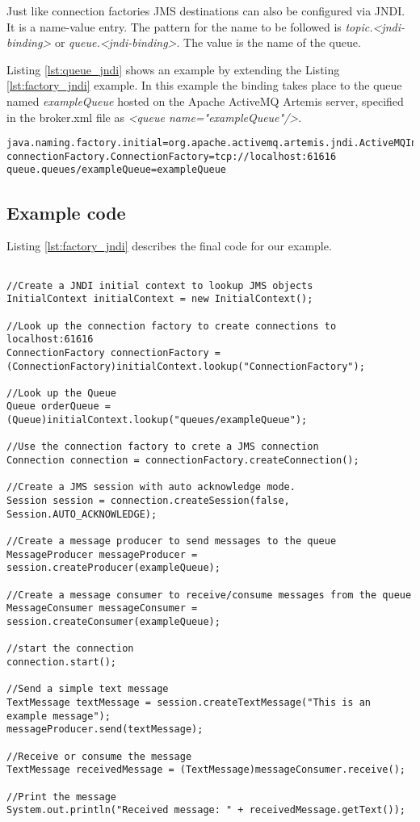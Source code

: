 Just like connection factories JMS destinations can also be configured via JNDI. It is a name-value entry. The pattern for the name to be followed is \textit{topic.<jndi-binding>} or \textit{queue.<jndi-binding>}. The value is the name of the queue. 

Listing \ref{lst:queue_jndi} shows an example by extending the Listing \ref{lst:factory_jndi} example. In this example the binding takes place to the queue named \textit{exampleQueue} hosted on the Apache ActiveMQ Artemis server, specified in the broker.xml file as \textit{<queue name="exampleQueue"/>}. 

\bigskip
\begin{lstlisting}[style=BashInputStyle,caption=ConnectionFactory JNDI, label={lst:queue_jndi}]
java.naming.factory.initial=org.apache.activemq.artemis.jndi.ActiveMQInitialContextFactory
connectionFactory.ConnectionFactory=tcp://localhost:61616
queue.queues/exampleQueue=exampleQueue
\end{lstlisting}

\subsection{Example code}

Listing \ref{lst:factory_jndi} describes the final code for our example.

\bigskip
\begin{lstlisting}[style=JavaInputStyle,caption=Example JMS code, label={lst:code}]

//Create a JNDI initial context to lookup JMS objects
InitialContext initialContext = new InitialContext();

//Look up the connection factory to create connections to localhost:61616
ConnectionFactory connectionFactory = (ConnectionFactory)initialContext.lookup("ConnectionFactory");

//Look up the Queue
Queue orderQueue = (Queue)initialContext.lookup("queues/exampleQueue");

//Use the connection factory to crete a JMS connection
Connection connection = connectionFactory.createConnection();

//Create a JMS session with auto acknowledge mode.
Session session = connection.createSession(false, Session.AUTO_ACKNOWLEDGE);

//Create a message producer to send messages to the queue
MessageProducer messageProducer = session.createProducer(exampleQueue);

//Create a message consumer to receive/consume messages from the queue
MessageConsumer messageConsumer = session.createConsumer(exampleQueue);

//start the connection
connection.start();

//Send a simple text message
TextMessage textMessage = session.createTextMessage("This is an example message");
messageProducer.send(textMessage);

//Receive or consume the message
TextMessage receivedMessage = (TextMessage)messageConsumer.receive();

//Print the message
System.out.println("Received message: " + receivedMessage.getText());
\end{lstlisting}